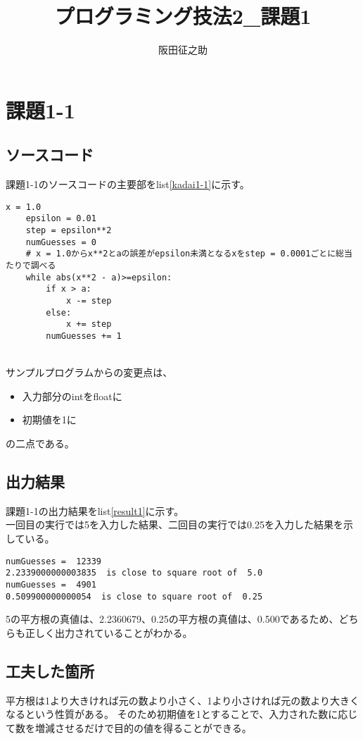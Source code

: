 \documentclass{ltjsarticle}
\begin{document}
\title{プログラミング技法2\_課題1}
\author{阪田征之助}
\maketitle
\newpage
\section*{課題1-1}
\subsection*{ソースコード}
課題1-1のソースコードの主要部をlist\ref{kadai1-1}に示す。

\begin{lstlisting}[caption=kadai1-1.py,label=kadai1-1]
    x = 1.0
    epsilon = 0.01
    step = epsilon**2
    numGuesses = 0
    # x = 1.0からx**2とaの誤差がepsilon未満となるxをstep = 0.0001ごとに総当たりで調べる
    while abs(x**2 - a)>=epsilon:
        if x > a:
            x -= step
        else:
            x += step
        numGuesses += 1
\end{lstlisting}

\\サンプルプログラムからの変更点は、

\begin{itemize}
    \item 入力部分のintをfloatに
    \item 初期値を1に
\end{itemize}
の二点である。

\subsection*{出力結果}
課題1-1の出力結果をlist\ref{result1}に示す。
\\一回目の実行では5を入力した結果、二回目の実行では0.25を入力した結果を示している。
\begin{lstlisting}[caption=output, label=result1]
numGuesses =  12339
2.2339000000003835  is close to square root of  5.0
numGuesses =  4901
0.509900000000054  is close to square root of  0.25
\end{lstlisting}
5の平方根の真値は、2.2360679、0.25の平方根の真値は、0.500であるため、どちらも正しく出力されていることがわかる。

\subsection*{工夫した箇所}
平方根は1より大きければ元の数より小さく、1より小さければ元の数より大きくなるという性質がある。
そのため初期値を1とすることで、入力された数に応じて数を増減させるだけで目的の値を得ることができる。
\newpage
\end{document}
